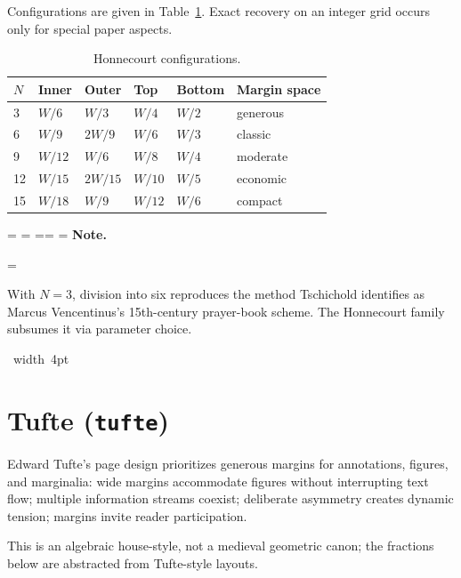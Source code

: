 \documentclass[11pt, twoside, openany]{book}
\makeatletter
\newcommand*{\cns@tag@artifact@begin}{}
\newcommand*{\cns@tag@artifact@end}{}
\newenvironment{TodoNote}[1][]{%
  \par\addvspace{0.5\baselineskip plus 2pt}%
  \setbox\cns@box=\vbox\bgroup
    \hsize=\linewidth
    \advance\hsize -10pt
    \linewidth=\hsize \columnwidth=\hsize
    \parindent=\z@
    \noindent\textbf{\sffamily Note\cns@ifnotempty{#1}{ \textmd{(#1)}}.}%
    \par\nobreak
    \@afterindentfalse\@afterheading
    \leftskip=\cns@indent\relax
    \ignorespaces
}{%
  \par
  \egroup
  \vbox{\hbox{%
    \cns@tag@artifact@begin\vrule width 4pt\cns@tag@artifact@end
    \hskip 6pt\relax
    \box\cns@box
  }}%
  \par\addvspace{0.5\baselineskip plus 2pt}%
}
\makeatother
\begin{document}
Configurations are given in Table~\ref{tab:vdhconfig}. Exact recovery on an integer grid occurs only for special paper aspects.

\begin{table}[h]
	\centering
	\caption{Honnecourt configurations.}
	\label{tab:vdhconfig}
	\begin{tabular}{@{}llllll@{}}
		\toprule
		$N$ & \bfseries Inner & \bfseries Outer & \bfseries Top & \bfseries Bottom & \bfseries Margin space \\
		\midrule
		3   & $W/6$           & $W/3$           & $W/4$         & $W/2$            & generous               \\
		6   & $W/9$           & $2W/9$          & $W/6$         & $W/3$            & classic                \\
		9   & $W/12$          & $W/6$           & $W/8$         & $W/4$            & moderate               \\
		12  & $W/15$          & $2W/15$         & $W/10$        & $W/5$            & economic               \\
		15  & $W/18$          & $W/9$           & $W/12$        & $W/6$            & compact                \\
		\bottomrule
	\end{tabular}
\end{table}

\begin{TodoNote}
	With $N=3$, division into six reproduces the method Tschichold identifies as Marcus Vencentinus's 15th-century prayer-book scheme. The Honnecourt family subsumes it via parameter choice.
\end{TodoNote}

\section{Tufte (\texttt{tufte})}\label{sec:tufte}

Edward Tufte's page design \cite{tufte2001visual,tufte1990envisioning,tufte1997visual,tufte2006beautiful,tufte2020seeing} prioritizes generous margins for annotations, figures, and marginalia: wide margins accommodate figures without interrupting text flow; multiple information streams coexist; deliberate asymmetry creates dynamic tension; margins invite reader participation.

This is an algebraic house-style, not a medieval geometric canon; the fractions below are abstracted from Tufte-style layouts.
\end{document}
